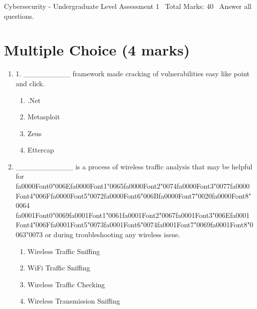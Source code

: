 \documentclass[12pt]{article}
\begin{document}
\begin{center}
Cybersecurity - Undergraduate Level Assessment 1 \
Total Marks: 40 \
Answer all questions.
\end{center}

\section*{Multiple Choice (4 marks)}
\begin{enumerate}[label=\arabic*.]
\item 1. \_\_\_\_\_\_\_\_\_ framework made cracking of vulnerabilities easy like point and click.
\begin{enumerate}[label=(\alph*)]
    \item .Net
    \item Metasploit
    \item Zeus
    \item Ettercap
\end{enumerate}
\item \_\_\_\_\_\_\_\_\_\_\_ is a process of wireless traffic analysis that may be helpful for {\csname fa0000Font0\endcsname\char"006E}{\csname fa0000Font1\endcsname\char"0065}{\csname fa0000Font2\endcsname\char"0074}{\csname fa0000Font3\endcsname\char"0077}{\csname fa0000Font4\endcsname\char"006F}{\csname fa0000Font5\endcsname\char"0072}{\csname fa0000Font6\endcsname\char"006B}{\csname fa0000Font7\endcsname\char"0020}{\csname fa0000Font8\endcsname\char"0064} {\csname fa0001Font0\endcsname\char"0069}{\csname fa0001Font1\endcsname\char"0061}{\csname fa0001Font2\endcsname\char"0067}{\csname fa0001Font3\endcsname\char"006E}{\csname fa0001Font4\endcsname\char"006F}{\csname fa0001Font5\endcsname\char"0073}{\csname fa0001Font6\endcsname\char"0074}{\csname fa0001Font7\endcsname\char"0069}{\csname fa0001Font8\endcsname\char"0063}{\char"0073} or during troubleshooting any wireless issue.
\begin{enumerate}[label=(\alph*)]
    \item Wireless Traffic Sniffing
    \item WiFi Traffic Sniffing
    \item Wireless Traffic Checking
    \item Wireless Transmission Sniffing
\end{enumerate}
\end{enumerate}
\end{document}
